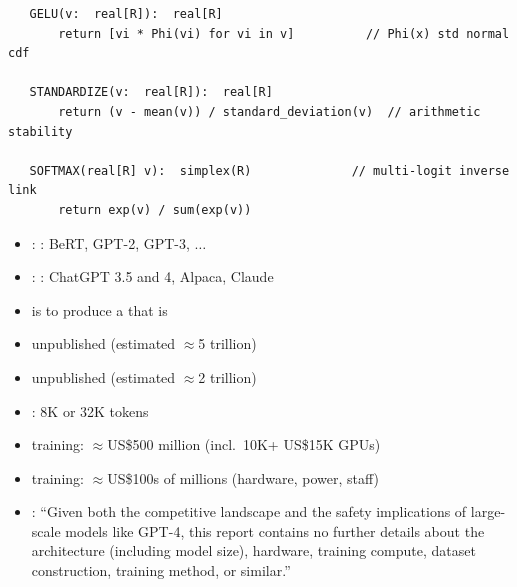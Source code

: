 \documentclass[9pt]{report}
\begin{document}
{\begin{verbatim}
   GELU(v:  real[R]):  real[R]
       return [vi * Phi(vi) for vi in v]          // Phi(x) std normal cdf

   STANDARDIZE(v:  real[R]):  real[R]
       return (v - mean(v)) / standard_deviation(v)  // arithmetic stability

   SOFTMAX(real[R] v):  simplex(R)              // multi-logit inverse link
       return exp(v) / sum(exp(v))
\end{verbatim}

\begin{itemize}
\item {}:  : BeRT, GPT-2, GPT-3, $\ldots$
\item {}:  : ChatGPT 3.5 and
  4, Alpaca, Claude
\item {} is to produce a  that is
\end{itemize}


\begin{itemize}
\item {} unpublished (estimated $\approx$5 trillion)
\item {} unpublished (estimated $\approx$2
  trillion)
\item {}: 8K or 32K tokens
\item {} training: $\approx$US\$500 million
  (incl.\ 10K+ US\$15K GPUs)
\item {} training: $\approx$US\$100s of
  millions (hardware, power, staff)
  \vfill
\item {}: {\small ``Given both
the competitive landscape and the safety implications of large-scale models like GPT-4, this report
contains no further details about the architecture (including model size), hardware, training compute,
dataset construction, training method, or similar.''}
\end{itemize}

}
\end{document}
